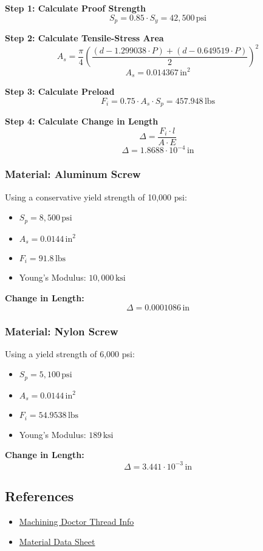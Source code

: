 \textbf{Step 1: Calculate Proof Strength}
\[
S_p = 0.85 \cdot S_y = 42,500 \, \text{psi}
\]

\textbf{Step 2: Calculate Tensile-Stress Area}
\[
A_s = \frac{\pi}{4} \left( \frac{(d - 1.299038 \cdot P) + (d - 0.649519 \cdot P)}{2} \right)^2
\]
\[
A_s = 0.014367 \, \text{in}^2
\]

\textbf{Step 3: Calculate Preload}
\[
F_i = 0.75 \cdot A_s \cdot S_p = 457.948 \, \text{lbs}
\]

\textbf{Step 4: Calculate Change in Length}
\[
\Delta = \frac{F_i \cdot l}{A \cdot E}
\]
\[
\Delta = 1.8688 \cdot 10^{-4} \, \text{in}
\]

\subsubsection*{Material: Aluminum Screw}
Using a conservative yield strength of 10,000 psi:
\begin{itemize}
    \item $S_p = 8,500 \, \text{psi}$
    \item $A_s = 0.0144 \, \text{in}^2$
    \item $F_i = 91.8 \, \text{lbs}$
    \item Young’s Modulus: $10,000 \, \text{ksi}$
\end{itemize}

\textbf{Change in Length:}
\[
\Delta = 0.0001086 \, \text{in}
\]

\subsubsection*{Material: Nylon Screw}
Using a yield strength of 6,000 psi:
\begin{itemize}
    \item $S_p = 5,100 \, \text{psi}$
    \item $A_s = 0.0144 \, \text{in}^2$
    \item $F_i = 54.9538 \, \text{lbs}$
    \item Young’s Modulus: $189 \, \text{ksi}$
\end{itemize}

\textbf{Change in Length:}
\[
\Delta = 3.441 \cdot 10^{-3} \, \text{in}
\]

\subsection*{References}
\begin{itemize}
    \item \href{https://www.machiningdoctor.com/threadinfo/?tid=15}{Machining Doctor Thread Info}
    \item \href{https://matweb.com/search/DataSheet.aspx?MatGUID=8d78f3cfcb6f49d595896ce6ce6a2ef1&ckck=1}{Material Data Sheet}
\end{itemize}

